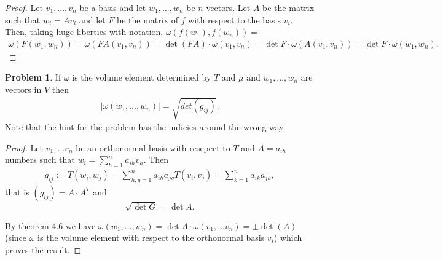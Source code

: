 \documentclass[20pt]{article}
\theoremstyle{plain}
\theoremstyle{definition}
\newtheorem*{problem}{Problem}
\begin{document}
  \begin{proof}
    Let $v_1, ..., v_n$ be a basis and let $w_1, ..., w_n$ be $n$ vectors.
    Let $A$ be the matrix such that $w_i = Av_i$ and let $F$ be the matrix 
    of $f$ with respect to the basis $v_i$.  Then, taking huge liberties with 
    notation, $\omega(f(w_1), f(w_n)) = $
    \begin{align*}
      \omega(F(w_1,w_n)) = 
      \omega(FA(v_1,v_n)) = 
      \det(FA)\cdot \omega(v_1, v_n) = 
      \det F \cdot \omega(A(v_1, v_n)) = 
      \det F \cdot \omega(w_1, w_n).
    \end{align*}
  \end{proof}


  \begin{problem}{4.3}
    If $\omega$ is the volume element determined by $T$ and $\mu$ and $w_1, ..., w_n$ are vectors in $V$ then 
    \begin{align*}
      |\omega(w_1, ..., w_n)| = \sqrt{det(g_{ij})}.
    \end{align*}    
    Note that the hint for the problem has the indicies around the wrong way.
  \end{problem}
  \begin{proof}
    Let $v_1, ...v_n$ be an orthonormal basis with resepect to $T$ and $A = a_{ih}$ numbers such that 
    $w_i = \sum_{h=1}^n a_{ih}v_h$.
    Then 
    \begin{align}
      g_{ij} := T(w_i, w_j) = \sum_{h,g=1}^n a_{ih}a_{jg}T(v_i, v_j) = \sum_{k=1}^n a_{ik}a_{jk},
    \end{align}
    that is $(g_{ij}) = A\cdot A^T$ and
    $$\sqrt{\det G} = \det A.$$

    By theorem 4.6 we have 
    $ \omega(w_1, ..., w_n) = \det A \cdot \omega(v_1, ...v_n) = \pm \det(A)$
    (since $\omega$ is the volume element with respect to the orthonormal basis $v_i$) which proves the result.
  \end{proof}
\end{document}
